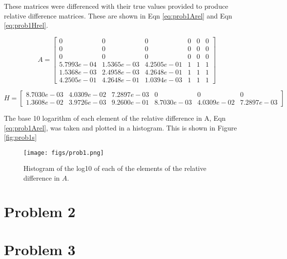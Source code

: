\documentclass[11pt]{article}
\begin{document}
These matrices were differenced with their true values provided to produce relative difference matrices. These are shown in Eqn \eqref{eq:prob1Arel} and Eqn \eqref{eq:prob1Hrel}.

\begin{equation}
\label{eq:prob1Arel}
A = \begin{bmatrix}
0     &       0         &   0         &   0    &        0     &       0 \\
0          &  0        &    0     &       0     &       0       &     0 \\
0         &   0    &        0      &      0     &       0    &        0 \\
5.7993e-04&   1.5365e-03  & 4.2505e-01 &   1 &   1  &  1 \\
1.5368e-03  & 2.4958e-03  & 4.2648e-01 &   1  &  1  &  1 \\
4.2505e-01  & 4.2648e-01 &  1.0394e-03  &  1  &  1  &  1
\end{bmatrix}
\end{equation}

\begin{equation}
\label{eq:prob1Hrel}
H = \begin{bmatrix}
8.7030e-03 &  4.0309e-02  & 7.2897e-03    &        0   &         0    &        0 \\
1.3608e-02 &  3.9726e-03  & 9.2600e-01  & 8.7030e-03  & 4.0309e-02 &  7.2897e-03
\end{bmatrix}
\end{equation}

The base 10 logarithm of each element of the relative difference in A, Eqn \eqref{eq:prob1Arel}, was taken and plotted in a histogram. This is shown in Figure \ref{fig:prob1s}

\begin{figure}[!htb]
	\centering
	\texttt{[image: figs/prob1.png]}
	\label{fig:prob1}
	\caption{Histogram of the log10 of each of the elements of the relative difference in $A$.}
\end{figure}

\section{Problem 2}

\section{Problem 3}

\newpage
\appendix
\end{document}
